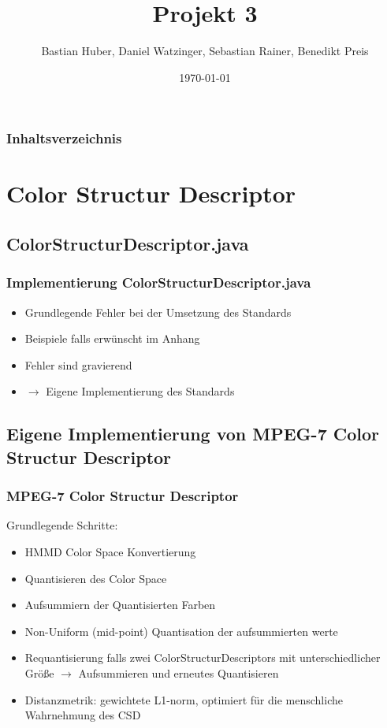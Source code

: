 \documentclass[11pt]{beamer}
\begin{document}
\graphicspath{{img/}}

\title[Multimedia Datenbanken]{Projekt 3}
\subtitle[Multimedia Datenbanken]{}
\author{Bastian Huber, Daniel Watzinger, Sebastian Rainer, Benedikt Preis}
\date{\today}

\frame{
	\titlepage
}

\begin{frame}
	\frametitle{Inhaltsverzeichnis}
	\tableofcontents
\end{frame}

\section{Color Structur Descriptor}
\subsection{ColorStructurDescriptor.java}
\begin{frame}
	\frametitle{Implementierung ColorStructurDescriptor.java}
	\begin{itemize}
		\item Grundlegende Fehler bei der Umsetzung des Standards
		\item Beispiele falls erwünscht im Anhang
		\item Fehler sind gravierend
		\item $\rightarrow$ Eigene Implementierung des Standards
	\end{itemize}
\end{frame}

\subsection{Eigene Implementierung von MPEG-7 Color Structur Descriptor}
\begin{frame}
	\frametitle{MPEG-7 Color Structur Descriptor}
	Grundlegende Schritte:
	\begin{itemize}
		\item HMMD Color Space Konvertierung
		\item Quantisieren des Color Space
		\item Aufsummiern der Quantisierten Farben
		\item Non-Uniform (mid-point) Quantisation der aufsummierten werte
		\item Requantisierung falls zwei ColorStructurDescriptors mit unterschiedlicher Größe $\rightarrow$ Aufsummieren und erneutes Quantisieren
		\item Distanzmetrik: gewichtete L1-norm, optimiert für die menschliche Wahrnehmung des CSD 

	\end{itemize}
\end{frame}
\end{document}
